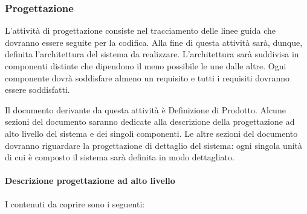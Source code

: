\subsubsection{Progettazione}

L'attività di progettazione consiste nel tracciamento delle linee
guida che dovranno essere seguite per la codifica. Alla fine di questa
attività sarà, dunque, definita l'architettura del sistema da
realizzare. L'architettura sarà suddivisa in componenti distinte che
dipendono il meno possibile le une dalle altre. Ogni componente dovrà
soddisfare almeno un requisito e tutti i requisiti dovranno essere
soddisfatti. 

Il documento derivante da questa attività è Definizione di Prodotto. Alcune sezioni del documento saranno dedicate alla descrizione della progettazione ad alto livello del
sistema e dei singoli componenti. Le altre sezioni del documento dovranno riguardare la progettazione di dettaglio del sistema: ogni singola unità di cui è composto il sistema sarà definita in modo dettagliato. 

\paragraph{Descrizione progettazione ad alto livello}

I contenuti da coprire sono i seguenti:

